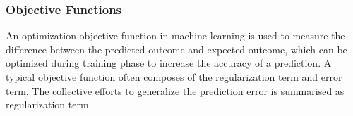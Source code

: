 \subsubsection{Objective Functions}
An optimization objective function in machine learning is used to measure the difference between the predicted outcome and expected outcome, which can be optimized during training phase to increase the accuracy of a prediction. A typical objective function often composes of the regularization term and error term. The collective efforts to generalize the prediction error is summarised as regularization term~\cite{goodfellow_2015}.  